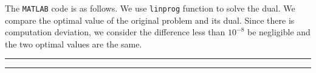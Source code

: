 The { \tt{MATLAB}} code is as follows. We use {\tt{linprog}} function to solve the dual. We compare the optimal value of the original problem and its dual. Since there is computation deviation, we consider the difference less than $10^{-8}$ be negligible and the two optimal values are the same.

\bigskip

\hrule

\small

\normalsize

\hrule

\bigskip